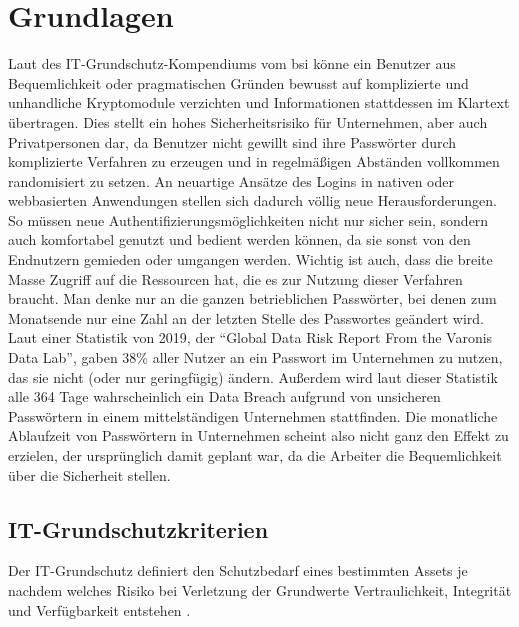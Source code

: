 \chapter{Grundlagen}
Laut des IT-Grundschutz-Kompendiums vom \ac{bsi} könne ein Benutzer aus Bequemlichkeit oder pragmatischen Gründen bewusst auf komplizierte und unhandliche Kryptomodule verzichten und Informationen stattdessen im Klartext übertragen. \cite{A5} Dies stellt ein hohes Sicherheitsrisiko für Unternehmen, aber auch Privatpersonen dar, da Benutzer nicht gewillt sind ihre Passwörter durch komplizierte Verfahren zu erzeugen und in regelmäßigen Abständen vollkommen randomisiert zu setzen. An neuartige Ansätze des Logins in nativen oder webbasierten Anwendungen stellen sich dadurch völlig neue Herausforderungen. So müssen neue Authentifizierungsmöglichkeiten nicht nur sicher sein, sondern auch komfortabel genutzt und bedient werden können, da sie sonst von den Endnutzern gemieden oder umgangen werden. Wichtig ist auch, dass die breite Masse Zugriff auf die Ressourcen hat, die es zur Nutzung dieser Verfahren braucht. Man denke nur an die ganzen betrieblichen Passwörter, bei denen zum Monatsende nur eine Zahl an der letzten Stelle des Passwortes geändert wird. Laut einer Statistik von 2019, der ``Global Data Risk Report From the Varonis Data Lab'', gaben 38\% aller Nutzer an ein Passwort im Unternehmen zu nutzen, das sie nicht (oder nur geringfügig) ändern. Außerdem wird laut dieser Statistik alle 364 Tage wahrscheinlich ein Data Breach aufgrund von unsicheren Passwörtern in einem mittelständigen Unternehmen stattfinden. Die monatliche Ablaufzeit von Passwörtern in Unternehmen scheint also nicht ganz den Effekt zu erzielen, der ursprünglich damit geplant war, da die Arbeiter die Bequemlichkeit über die Sicherheit stellen.

\section{IT-Grundschutzkriterien}
Der IT-Grundschutz definiert den Schutzbedarf eines bestimmten Assets je nachdem welches Risiko bei Verletzung der Grundwerte Vertraulichkeit, Integrität und Verfügbarkeit entstehen \cite{A7}.
\newpage

